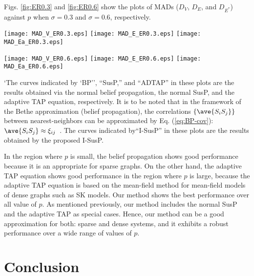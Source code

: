 \documentclass[%
 reprint,
 amsmath,amssymb,
 aps, 
 pre,
 showkeys
]{revtex4-1}
\begin{document}
Figs. \ref{fig:ER0.3} and \ref{fig:ER0.6} show the plots of MADs ($D_V$, $D_E$, and $D_{E^*}$) 
against $p$ when $\sigma = 0.3$ and $\sigma = 0.6$, respectively.
\begin{figure*}[hbt]
\begin{center}
\texttt{[image: MAD\_V\_ER0.3.eps]}
\texttt{[image: MAD\_E\_ER0.3.eps]}
\texttt{[image: MAD\_Ea\_ER0.3.eps]}
\end{center}
\caption{MADs when $\sigma = 0.3$. Each point is obtained by averaging over 1500 trials.}
\label{fig:ER0.3}
\end{figure*}
\begin{figure*}[hbt]
\begin{center}
\texttt{[image: MAD\_V\_ER0.6.eps]}
\texttt{[image: MAD\_E\_ER0.6.eps]}
\texttt{[image: MAD\_Ea\_ER0.6.eps]}
\end{center}
\caption{MADs when $\sigma = 0.6$. Each point is obtained by averaging over 10000 trials.}
\label{fig:ER0.6}
\end{figure*}
`The curves indicated by `BP'', ``SusP,'' and ``ADTAP'' in these plots are the results obtained via the normal belief propagation, the normal SusP, 
and the adaptive TAP equation, respectively. 
It is to be noted that in the framework of the Bethe approximation (belief propagation), 
the correlations $\{\ave{S_iS_j}\}$ between nearest-neighbors can be approximated by Eq. (\ref{eq:BP-cov}): 
$\ave{S_iS_j}\approx \xi_{ij}$~\cite{Horiguchi1981}. 
The curves indicated by``I-SusP'' in these plots are the results obtained by the proposed I-SusP.

In the region where $p$ is small, the belief propagation shows good performance because it is an appropriate for sparse graphs. 
On the other hand, the adaptive TAP equation shows good performance in the region where $p$ is large,  
because the adaptive TAP equation is based on the mean-field method for mean-field models of dense graphs such as SK models. 
Our method shows the best performance over all value of $p$.
As mentioned previously, our method includes the normal SusP and the adaptive TAP as special cases. 
Hence, our method can be a good approximation for both: sparse and dense systems, and it exhibits a robust performance over a wide range of values of $p$.

\section{Conclusion}
\end{document}
